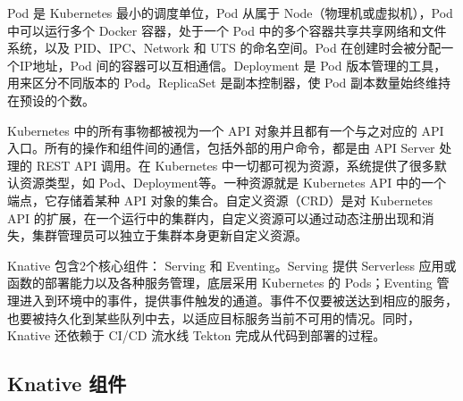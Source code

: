 \documentclass[11pt]{article}
\begin{document}
Pod 是 Kubernetes 最小的调度单位，Pod 从属于 Node（物理机或虚拟机），Pod 中可以运行多个 Docker 容器，处于一个 Pod 中的多个容器共享共享网络和文件系统，以及 PID、IPC、Network 和 UTS 的命名空间\cite{k8s-pod}。Pod 在创建时会被分配一个IP地址，Pod 间的容器可以互相通信。Deployment 是 Pod 版本管理的工具，用来区分不同版本的 Pod。ReplicaSet 是副本控制器，使 Pod 副本数量始终维持在预设的个数。


Kubernetes 中的所有事物都被视为一个 API 对象并且都有一个与之对应的 API 入口。所有的操作和组件间的通信，包括外部的用户命令，都是由 API Server 处理的 REST API 调用。在 Kubernetes 中一切都可视为资源，系统提供了很多默认资源类型，如 Pod、Deployment等。一种资源就是 Kubernetes API 中的一个端点，它存储着某种 API 对象的集合。自定义资源（CRD）是对 Kubernetes API 的扩展，在一个运行中的集群内，自定义资源可以通过动态注册出现和消失，集群管理员可以独立于集群本身更新自定义资源\cite{k8s-CRD}。


Knative 包含2个核心组件： Serving 和 Eventing。Serving 提供 Serverless 应用或函数的部署能力以及各种服务管理，底层采用 Kubernetes 的 Pods；Eventing 管理进入到环境中的事件，提供事件触发的通道。事件不仅要被送达到相应的服务，也要被持久化到某些队列中去，以适应目标服务当前不可用的情况。同时，Knative 还依赖于 CI/CD 流水线 Tekton 完成从代码到部署的过程。

\subsection{Knative 组件}
\end{document}
